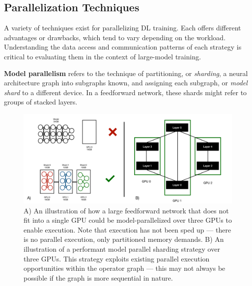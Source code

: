 \subsection{Parallelization Techniques}\label{sec:parallelization}
A variety of techniques exist for parallelizing DL training. Each offers different advantages or drawbacks, which tend to vary depending on the workload. Understanding the data access and communication patterns of each strategy is critical to evaluating them in the context of large-model training.

\textbf{Model parallelism} refers to the technique of partitioning, or \textit{sharding}, a neural architecture graph into subgraphs known, and assigning each subgraph, or \textit{model shard} to a different device. In a feedforward network, these shards might refer to groups of stacked layers.

\begin{figure}[th!]
\centering
	\includegraphics[keepaspectratio=true, width=0.9\linewidth]{images/combined_model_parallel}
	\caption{A) An illustration of how a large feedforward network that does not fit into a single GPU could be model-parallelized over three GPUs to enable execution. Note that execution has not been sped up --- there is no parallel execution, only partitioned memory demands. B) An illustration of a performant model parallel sharding strategy over three GPUs. This strategy exploits existing parallel execution opportunities within the operator graph --- this may not always be possible if the graph is more sequential in nature.}
	\label{fig:model_parallel_combined}
\end{figure}

